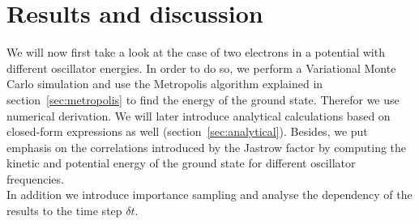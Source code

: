 \section{Results and discussion}\label{sec:result}
We will now first take a look at the case of two electrons in a potential with different oscillator energies. In order to do so, we perform a Variational Monte Carlo simulation and use the Metropolis algorithm explained in section~\ref{sec:metropolis} to find the energy of the ground state. Therefor we use numerical derivation. We will later introduce analytical calculations based on closed-form expressions as well (section~\ref{sec:analytical}). Besides, we put emphasis on the correlations introduced by the Jastrow factor by computing the kinetic and potential energy of the ground state for different oscillator frequencies.\\
In addition we introduce importance sampling and analyse the dependency of the results to the time step $\delta t$.\\
